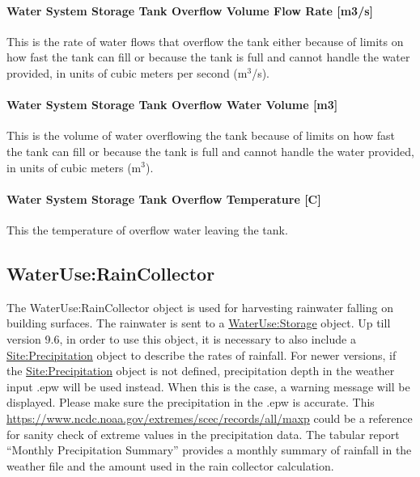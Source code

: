 \paragraph{Water System Storage Tank Overflow Volume Flow Rate {[}m3/s{]}}\label{water-system-storage-tank-overflow-volume-flow-rate-m3s}

This is the rate of water flows that overflow the tank either because of limits on how fast the tank can fill or because the tank is full and cannot handle the water provided, in units of cubic meters per second (m\(^{3}\)/s).

\paragraph{Water System Storage Tank Overflow Water Volume {[}m3{]}}\label{water-system-storage-tank-overflow-water-volume-m3}

This is the volume of water overflowing the tank because of limits on how fast the tank can fill or because the tank is full and cannot handle the water provided, in units of cubic meters (m\(^{3}\)).

\paragraph{Water System Storage Tank Overflow Temperature {[}C{]}}\label{water-system-storage-tank-overflow-temperature-c}

This the temperature of overflow water leaving the tank.

\subsection{WaterUse:RainCollector}\label{wateruseraincollector}

The WaterUse:RainCollector object is used for harvesting rainwater falling on building surfaces. The rainwater is sent to a \hyperref[waterusestorage]{WaterUse:Storage} object. Up till version 9.6, in order to use this object, it is necessary to also include a \hyperref[siteprecipitation]{Site:Precipitation} object to describe the rates of rainfall. For newer versions, if the \hyperref[siteprecipitation]{Site:Precipitation} object is not defined, precipitation depth in the weather input .epw will be used instead. When this is the case, a warning message will be displayed. Please make sure the precipitation in the .epw is accurate. This \href{table by the State Climate Extreme Committee}{https://www.ncdc.noaa.gov/extremes/scec/records/all/maxp} could be a reference for sanity check of extreme values in the precipitation data. The tabular report ``Monthly Precipitation Summary'' provides a monthly summary of rainfall in the weather file and the amount used in the rain collector calculation.

